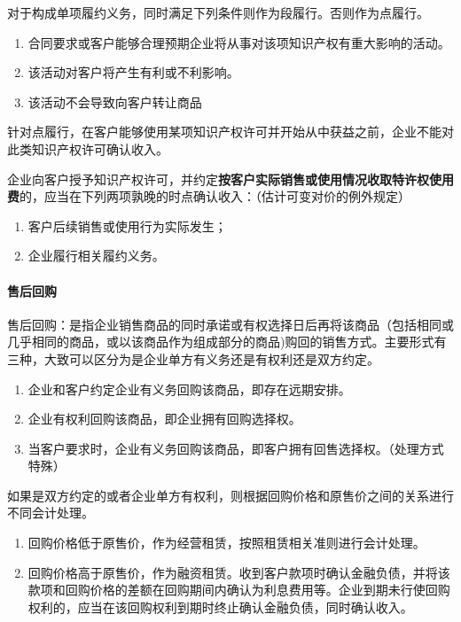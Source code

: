 \documentclass[UTF8,12pt]{ctexart}
\numberwithin{equation}{section} %
\numberwithin{figure}{section}
\numberwithin{table}{section}
\begin{document}
	对于构成单项履约义务，同时满足下列条件则作为段履行。否则作为点履行。
	\begin{enumerate}
		\item 合同要求或客户能够合理预期企业将从事对该项知识产权有重大影响的活动。
		
		\item 该活动对客户将产生有利或不利影响。
		
		\item 该活动不会导致向客户转让商品
	\end{enumerate}

	针对点履行，在客户能够使用某项知识产权许可并开始从中获益之前，企业不能对此类知识产权许可确认收入。
	
	企业向客户授予知识产权许可，并约定\textbf{按客户实际销售或使用情况收取特许权使用费}的，应当在下列两项孰晚的时点确认收入：（估计可变对价的例外规定）
	\begin{enumerate}
		\item 客户后续销售或使用行为实际发生；
		
		\item 企业履行相关履约义务。
	\end{enumerate}
	
	\paragraph{售后回购}
	售后回购：是指企业销售商品的同时承诺或有权选择日后再将该商品（包括相同或几乎相同的商品，或以该商品作为组成部分的商品)购回的销售方式。主要形式有三种，大致可以区分为是企业单方有义务还是有权利还是双方约定。
	\begin{enumerate}
		\item 企业和客户约定企业有义务回购该商品，即存在远期安排。
		
		\item 企业有权利回购该商品，即企业拥有回购选择权。
		
		\item 当客户要求时，企业有义务回购该商品，即客户拥有回售选择权。（处理方式特殊）
	\end{enumerate}

	如果是双方约定的或者企业单方有权利，则根据回购价格和原售价之间的关系进行不同会计处理。
	\begin{enumerate}
		\item 回购价格低于原售价，作为经营租赁，按照租赁相关准则进行会计处理。
		
		\item 回购价格高于原售价，作为融资租赁。收到客户款项时确认金融负债，并将该款项和回购价格的差额在回购期间内确认为利息费用等。企业到期未行使回购权利的，应当在该回购权利到期时终止确认金融负债，同时确认收入。
	\end{enumerate}
\end{document}
